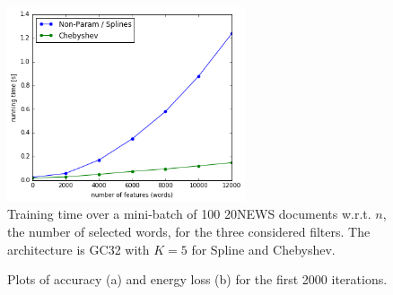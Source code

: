 \documentclass{article}
\begin{document}
\begin{figure}[h!]
\vspace{0.5cm}
\centering
\includegraphics[width=7cm]{images/speed.png}
\caption{Training time over a mini-batch of 100 20NEWS documents w.r.t. $n$, the
number of selected words, for the three considered filters. The architecture is
GC32 with $K=5$ for Spline and Chebyshev.}
\label{fig:runtime}
\end{figure}

\begin{figure}[h!]
\centering
{}
\hfill
{}
\caption{Plots of accuracy (a) and energy loss (b) for the first 2000
iterations.}
\label{fig:convergence}
\end{figure}
\end{document}
